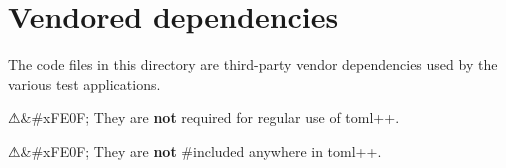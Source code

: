 \chapter{Vendored dependencies}
\hypertarget{md__c_1_2_users_2_h_p_2_documents_2_git_hub_2_minero-_game_2_classes_2_config_man_2lib_2tomlplus51af9d8028011a3e4eca5dd906c0f7ea}{}\label{md__c_1_2_users_2_h_p_2_documents_2_git_hub_2_minero-_game_2_classes_2_config_man_2lib_2tomlplus51af9d8028011a3e4eca5dd906c0f7ea}
\label{md__c_1_2_users_2_h_p_2_documents_2_git_hub_2_minero-_game_2_classes_2_config_man_2lib_2tomlplus51af9d8028011a3e4eca5dd906c0f7ea_autotoc_md149}%
%
 The code files in this directory are third-\/party \textquotesingle{}vendor\textquotesingle{} dependencies used by the various test applications.

⚠\&\#x\+FE0F; They are {\bfseries{not}} required for regular use of toml++.

⚠\&\#x\+FE0F; They are {\bfseries{not}} {\ttfamily \#included} anywhere in toml++. 